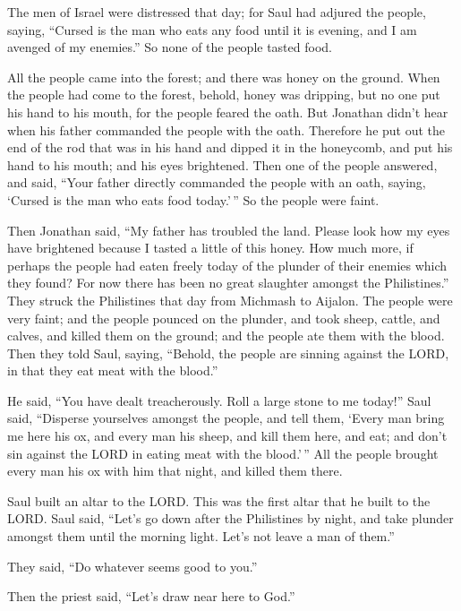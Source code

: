  The men of Israel were distressed that day; for Saul had
adjured the people, saying, ``Cursed is the man who eats any food until
it is evening, and I am avenged of my enemies.'' So none of the people
tasted food.

 All the people came into the forest; and there was honey
on the ground.  When the people had come to the forest,
behold, honey was dripping, but no one put his hand to his mouth, for
the people feared the oath.  But Jonathan didn't hear when
his father commanded the people with the oath. Therefore he put out the
end of the rod that was in his hand and dipped it in the honeycomb, and
put his hand to his mouth; and his eyes brightened.  Then
one of the people answered, and said, ``Your father directly commanded
the people with an oath, saying, `Cursed is the man who eats food
today.'\,'' So the people were faint.

 Then Jonathan said, ``My father has troubled the land.
Please look how my eyes have brightened because I tasted a little of
this honey.  How much more, if perhaps the people had eaten
freely today of the plunder of their enemies which they found? For now
there has been no great slaughter amongst the Philistines.''
 They struck the Philistines that day from Michmash to
Aijalon. The people were very faint;  and the people
pounced on the plunder, and took sheep, cattle, and calves, and killed
them on the ground; and the people ate them with the blood.
 Then they told Saul, saying, ``Behold, the people are
sinning against the LORD, in that they eat meat with the blood.''

He said, ``You have dealt treacherously. Roll a large stone to me
today!''  Saul said, ``Disperse yourselves amongst the
people, and tell them, `Every man bring me here his ox, and every man
his sheep, and kill them here, and eat; and don't sin against the LORD
in eating meat with the blood.'\,'' All the people brought every man his
ox with him that night, and killed them there.

 Saul built an altar to the LORD. This was the first altar
that he built to the LORD.  Saul said, ``Let's go down
after the Philistines by night, and take plunder amongst them until the
morning light. Let's not leave a man of them.''

They said, ``Do whatever seems good to you.''

Then the priest said, ``Let's draw near here to God.''

